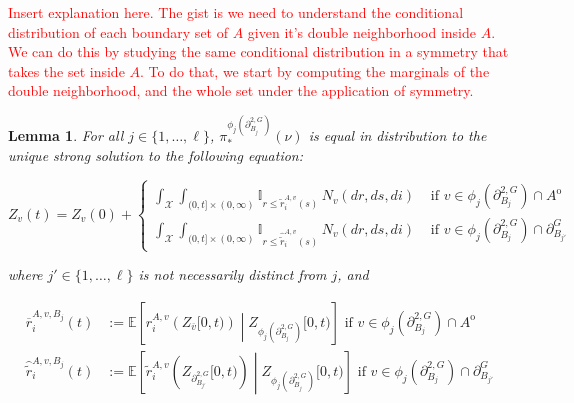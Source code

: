 \documentclass[12pt]{article}
\newcommand{\mb}{\mathbb}
\newcommand{\mc}{\mathcal}
\newcommand{\ov}{\overline}
\newcommand{\te}{\text}
\newcommand{\tr}{\textcolor{red}}
\newcommand{\ind}{\hspace{24pt}}
\newcommand{\ex}[1]{\mb{E}\left[#1\right]}			%
\newcommand{\defeq}{:=}								%
\newcommand{\sta}{\mc{X}}							%
\newcommand{\gneigh}[2]{\partial^{#1}_{#2}}			%
\newcommand{\dgneigh}[2]{\partial^{2,#1}_{#2}}		%
\newcommand{\cl}[1]{\ov{#1}}						%
\newcommand{\poiss}{N}								%
\newcommand{\rate}{r}								%
\newcommand{\proj}{\pi}								%
\newcommand{\poissv}[1]{_{#1}}						%
\newcommand{\vind}[1]{_{#1}}						%
\newcommand{\tme}[1]{(#1)}							%
\newcommand{\tmi}[1]{#1}							%
\newcommand{\vpara}[1]{^{#1}}						%
\newcommand{\stpara}[1]{_{#1}}						%
\newcommand{\gvpara}[2]{^{#1,#2}}					%
\newcommand{\psf}{_*}								%
\newcommand{\psize}{\ell}							%
\newcommand{\brate}{\alt{\rate}}					%
\newcommand{\inte}[1]{{#1}^\mathrm{o}}				%
\newcommand{\alt}[1]{\tilde{#1}}					%
\newcommand{\mm}{\nu}								%
\newcommand{\Xh}{Z}									%
\newcommand{\bgrate}{\ov{\rate}}					%
\newcommand{\bcrate}{\hat{\brate}}					%
\newcommand{\gvjpara}[3]{^{#1,#2,#3}}				%
\newtheorem{lem}[thms]{Lemma}
\begin{document}
\ind \tr{Insert explanation here. The gist is we need to understand the conditional distribution of each boundary set of \(A\) given it's double neighborhood inside \(A\). We can do this by studying the same conditional distribution in a symmetry that takes the set inside \(A\). To do that, we start by computing the marginals of the double neighborhood, and the whole set under the application of symmetry.}

\begin{lem}
For all \(j \in \{1,\dots,\psize\}\), \(\proj\psf\vpara{\phi_j(\dgneigh{G}{B_j})}(\mm)\) is equal in distribution to the unique strong solution to the following equation:

\begin{equation}
\Xh\vind{v}\tme{t} = \Xh\vind{v}\tme{0} + \begin{cases}
\int_\sta\int_{(0,t]\times (0,\infty)} \mb{I}_{r \leq \brate\gvpara{A}{v}\stpara{i}(s)}\,\poiss\poissv{v}(dr,ds,di)&\te{ if } v \in \phi_j(\dgneigh{G}{B_j})\cap \inte{A}\\
\int_\sta\int_{(0,t]\times (0,\infty)} \mb{I}_{r \leq \bcrate\gvpara{A}{v}\stpara{i}(s)}\,\poiss\poissv{v}(dr,ds,di)&\te{ if } v \in \phi_j(\dgneigh{G}{B_j})\cap\gneigh{G}{B_{j'}}
\end{cases}
\label{Uq::marg1eqn}
\end{equation}

where \(j' \in \{1,\dots,\psize\}\) is not necessarily distinct from \(j\), and

\begin{align}
\bgrate\gvjpara{A}{v}{B_j}\stpara{i}(t) &\defeq \ex{\rate\gvpara{A}{v}\stpara{i}\left(\Xh\vind{\cl{v}}\tmi{[0,t)}\right)\middle|\Xh\vind{\phi_j(\dgneigh{G}{B_j})}\tmi{[0,t)}} \te{ if } v \in  \phi_j(\dgneigh{G}{B_j})\cap \inte{A} \label{Uq::brrt}\\
\bcrate\gvjpara{A}{v}{B_j}\stpara{i}(t) &\defeq \ex{\brate\gvpara{A}{v}\stpara{i}\left(\Xh\vind{\dgneigh{G}{B_{j'}}}\tmi{[0,t)}\right)\middle| \Xh\vind{\phi_j(\dgneigh{G}{B_j})}\tmi{[0,t)}} \te{ if } v \in \phi_j(\dgneigh{G}{B_j})\cap\gneigh{G}{B_{j'}}\label{Uq::brcdrt}
\end{align}
\label{Uq::marg}
\end{lem}
\end{document}
